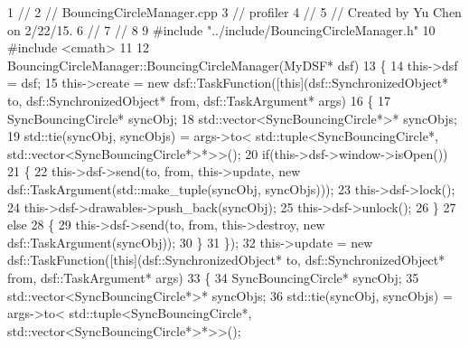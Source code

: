 \begin{DoxyCodeInclude}
1 \textcolor{comment}{//}
2 \textcolor{comment}{//  BouncingCircleManager.cpp}
3 \textcolor{comment}{//  profiler}
4 \textcolor{comment}{//}
5 \textcolor{comment}{//  Created by Yu Chen on 2/22/15.}
6 \textcolor{comment}{//}
7 \textcolor{comment}{//}
8 
9 \textcolor{preprocessor}{#include "../include/BouncingCircleManager.h"}
10 \textcolor{preprocessor}{#include <cmath>}
11 
12 BouncingCircleManager::BouncingCircleManager(MyDSF* dsf)
13 \{
14     this->dsf = dsf;
15     this->create = \textcolor{keyword}{new} dsf::TaskFunction([\textcolor{keyword}{this}](dsf::SynchronizedObject* to, dsf::SynchronizedObject* from,
       dsf::TaskArgument* args)
16                                          \{
17                                              SyncBouncingCircle* syncObj;
18                                              std::vector<SyncBouncingCircle*>* syncObjs;
19                                              std::tie(syncObj, syncObjs) = args->to<
      std::tuple<SyncBouncingCircle*, std::vector<SyncBouncingCircle*>*>>();
20                                              \textcolor{keywordflow}{if}(this->dsf->window->isOpen())
21                                              \{
22                                                  this->dsf->send(to, from, this->update, \textcolor{keyword}{new} 
      dsf::TaskArgument(std::make\_tuple(syncObj, syncObjs)));
23                                                  this->dsf->lock();
24                                                  this->dsf->drawables->push\_back(syncObj);
25                                                  this->dsf->unlock();
26                                              \}
27                                              \textcolor{keywordflow}{else}
28                                              \{
29                                                  this->dsf->send(to, from, this->destroy, \textcolor{keyword}{new} 
      dsf::TaskArgument(syncObj));
30                                              \}
31                                          \});
32     this->update = \textcolor{keyword}{new} dsf::TaskFunction([\textcolor{keyword}{this}](dsf::SynchronizedObject* to, dsf::SynchronizedObject* from,
       dsf::TaskArgument* args)
33                                          \{
34                                              SyncBouncingCircle* syncObj;
35                                              std::vector<SyncBouncingCircle*>* syncObjs;
36                                              std::tie(syncObj, syncObjs) = args->to<
      std::tuple<SyncBouncingCircle*, std::vector<SyncBouncingCircle*>*>>();

\end{DoxyCodeInclude}
